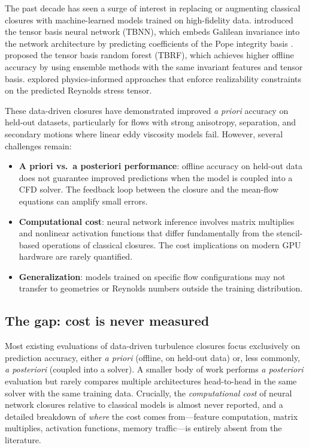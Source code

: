 The past decade has seen a surge of interest in replacing or augmenting classical closures with machine-learned models trained on high-fidelity data.
\citet{Ling2016} introduced the tensor basis neural network (TBNN), which embeds Galilean invariance into the network architecture by predicting coefficients of the Pope integrity basis \citep{Pope1975}.
\citet{Kaandorp2020} proposed the tensor basis random forest (TBRF), which achieves higher offline accuracy by using ensemble methods with the same invariant features and tensor basis.
\citet{Wu2018} explored physics-informed approaches that enforce realizability constraints on the predicted Reynolds stress tensor.

These data-driven closures have demonstrated improved \emph{a priori} accuracy on held-out datasets, particularly for flows with strong anisotropy, separation, and secondary motions where linear eddy viscosity models fail.
However, several challenges remain:
\begin{itemize}
    \item \textbf{A priori vs.\ a posteriori performance}: offline accuracy on held-out data does not guarantee improved predictions when the model is coupled into a CFD solver. The feedback loop between the closure and the mean-flow equations can amplify small errors.
    \item \textbf{Computational cost}: neural network inference involves matrix multiplies and nonlinear activation functions that differ fundamentally from the stencil-based operations of classical closures. The cost implications on modern GPU hardware are rarely quantified.
    \item \textbf{Generalization}: models trained on specific flow configurations may not transfer to geometries or Reynolds numbers outside the training distribution.
\end{itemize}

\subsection{The gap: cost is never measured}

Most existing evaluations of data-driven turbulence closures focus exclusively on prediction accuracy, either \emph{a priori} (offline, on held-out data) or, less commonly, \emph{a posteriori} (coupled into a solver).
A smaller body of work performs \emph{a posteriori} evaluation but rarely compares multiple architectures head-to-head in the same solver with the same training data.
Crucially, the \emph{computational cost} of neural network closures relative to classical models is almost never reported, and a detailed breakdown of \emph{where} the cost comes from---feature computation, matrix multiplies, activation functions, memory traffic---is entirely absent from the literature.

